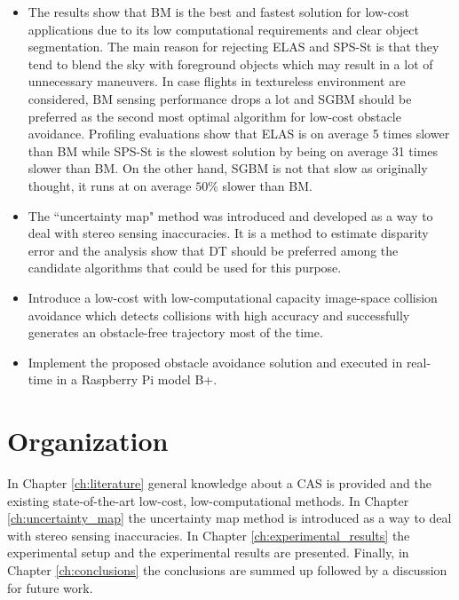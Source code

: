\begin{itemize}
	\item The results show that \ac{BM} is the best and fastest solution for low-cost applications due to its low computational requirements and clear object segmentation. The main reason for rejecting \ac{ELAS} and \ac{SPS-St} is that they tend to blend the sky with foreground objects which may result in a lot of unnecessary maneuvers. In case flights in textureless environment are considered, \ac{BM} sensing performance drops a lot and \ac{SGBM} should be preferred as the second most optimal algorithm for low-cost obstacle avoidance. Profiling evaluations show that \ac{ELAS} is on average 5 times slower than \ac{BM} while \ac{SPS-St} is the slowest solution by being on average 31 times slower than \ac{BM}. On the other hand, \ac{SGBM} is not that slow as originally thought, it runs at on average $50\%$ slower than \ac{BM}.
	\item The ``uncertainty map" method was introduced and developed as a way to deal with stereo sensing inaccuracies. It is a method to estimate disparity error and the analysis show that \ac{DT} should be preferred among the candidate algorithms that could be used for this purpose. 
	\item Introduce a low-cost with low-computational capacity image-space collision avoidance which detects collisions with high accuracy and successfully generates an obstacle-free trajectory most of the time. 
	\item Implement the proposed obstacle avoidance solution and executed in real-time in a Raspberry Pi model B+.
\end{itemize}


\section{Organization}

In Chapter \ref{ch:literature} general knowledge about a \ac{CAS} is provided and the existing state-of-the-art low-cost, low-computational methods. In Chapter \ref{ch:uncertainty_map} the uncertainty map method is introduced as a way to deal with stereo sensing inaccuracies. In Chapter \ref{ch:experimental_results} the experimental setup and the experimental results are presented. Finally, in Chapter \ref{ch:conclusions} the conclusions are summed up followed by a discussion for future work.
